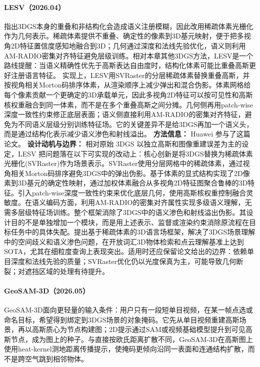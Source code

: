 \paragraph{LESV（2026.04）\cite{2604_01388}}
指出3DGS本身的重叠和非结构化会造成语义注册模糊，因此改用稀疏体素光栅化作为几何表示。稀疏体素提供不重叠、确定性的像素到3D基元映射，便于把多视角2D特征置信度感知地融合到3D；几何通过深度和法线先验优化，语义则利用AM-RADIO密集对齐特征避免层级训练。相对本章其他3DGS方法，LESV是一个路线提醒：当语义精确性优先于高斯表达自由度时，结构化体素可能比重叠高斯更好注册语言特征。
实现上，LESV用SVRaster的分层稀疏体素替换重叠高斯，并按视角相关Morton码排序体素，从渲染顺序上减少弹出和混合伪影。体素网格给每个像素贡献一个更确定的3D承载单元，因此多视角2D特征可以按可见性和高斯核权重融合到同一体素，而不是在多个重叠高斯之间分摊。几何侧再用patch-wise深度一致性约束修正底层表面；语义侧直接利用AM-RADIO的密集对齐特征，避免为不同语义层级分别训练特征场。它的关键差异不是给3DGS再加一个语义头，而是通过结构化表示减少语义渗色和射线溢出。
\textbf{方法信息：} Huawei 参与了这篇论文。
\textbf{设计动机与边界：} 相对原始 3DGS 以独立高斯和图像重建误差为主的设定，LESV 把问题落在以下可实现的改动上：核心创新是将3DGS替换为稀疏体素光栅化(SVRaster)作为场景表示。SVRaster使用分层网格中的稀疏体素，通过视角相关Morton码排序避免3DGS中的弹出伪影。基于体素的显式结构实现了2D像素到3D基元的确定性映射，通过加权体素融合从多视角2D特征图聚合鲁棒的3D特征。引入patch-wise深度一致性约束来优化底层几何，使用高斯核权重控制融合灵敏度。在语义编码方面，利用AM-RADIO的密集对齐属性实现多级语义理解，无需多层级特征场训练。整个框架消除了3DGS中的语义渗色和射线溢出伪影。其设计目的不是单独增加一个模块，而是用上述表示、监督或渲染约束消除原流程在目标任务中的具体失配。提出基于稀疏体素的3D语言场框架，解决了3DGS场景理解中的空间歧义和语义渗色问题，在开放词汇3D物体检索和点云理解基准上达到SOTA，尤其在细粒度查询上表现突出。适用时还应保留论文给出的边界：依赖单目深度和法线先验的质量；SVRaster优化仍以光度保真为主，可能导致几何断裂；对遮挡区域的处理有待提升。
\paragraph{GeoSAM-3D（2026.05）\cite{2606_00447}}
GeoSAM-3D面向更轻量的输入条件：用户只有一段短单目视频，在某一帧点选或命名目标，希望得到绑定到3DGS场景的对象掩码。它先从单目视频重建高斯场景，再以高斯质心为节点构建图；2D提示通过SAM或视频基础模型提升到可见高斯节点，成为图上的种子。与直接按欧氏距离扩散不同，GeoSAM-3D在高斯图上使用heat-kernel测地距离传播提示，使掩码更倾向沿同一表面和连通结构扩散，而不是跨空气跳到相邻物体。


